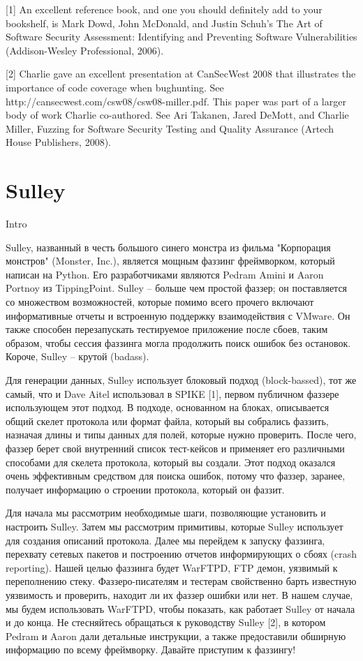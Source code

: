 \documentclass[12pt, a4paper, oneside]{book}
\begin{document}
[1] An excellent reference book, and one you should definitely add to your bookshelf, is Mark Dowd, John McDonald, and Justin Schuh’s The Art of Software Security Assessment: Identifying and Preventing Software Vulnerabilities (Addison-Wesley Professional, 2006).

[2] Charlie gave an excellent presentation at CanSecWest 2008 that illustrates the importance of code coverage when bughunting. See http://cansecwest.com/csw08/csw08-miller.pdf. This paper was part of a larger body of work Charlie co-authored. See Ari Takanen, Jared DeMott, and Charlie Miller, Fuzzing for Software Security Testing and Quality Assurance (Artech House Publishers, 2008).

\chapter{Sulley}
Intro

Sulley, названный в честь большого синего монстра из фильма "Корпорация монстров" (Monster, Inc.), является мощным фаззинг фреймворком, который написан на Python. Его разработчиками являются Pedram Amini и Aaron Portnoy из TippingPoint. Sulley – больше чем простой фаззер; он поставляется со множеством возможностей, которые помимо всего прочего включают информативные отчеты и встроенную поддержку взаимодействия с VMware. Он также способен перезапускать тестируемое приложение после сбоев, таким образом, чтобы сессия фаззинга могла продолжить поиск ошибок без остановок. Короче, Sulley – крутой (badass).

Для генерации данных, Sulley использует блоковый подход (block-bassed), тот же самый, что и Dave Aitel использовал в SPIKE [1], первом публичном фаззере использующем этот подход. В подходе, основанном на блоках, описывается общий скелет протокола или формат файла, который вы собрались фаззить, назначая длины и типы данных для полей, которые нужно проверить. После чего, фаззер берет свой внутренний список тест-кейсов и применяет его различными способами для скелета протокола, который вы создали. Этот подход оказался очень эффективным средством для поиска ошибок, потому что фаззер, заранее, получает информацию о строении протокола, который он фаззит.

Для начала мы рассмотрим необходимые шаги, позволяющие установить и настроить Sulley. Затем мы рассмотрим примитивы, которые Sulley использует для создания описаний протокола. Далее мы перейдем к запуску фаззинга, перехвату сетевых пакетов и построению отчетов информирующих о сбоях (crash reporting). Нашей целью фаззинга будет WarFTPD, FTP демон, уязвимый к переполнению стеку. Фаззеро-писателям и тестерам свойственно барть известную уязвимость и проверить, находит ли их фаззер ошибки или нет. В нашем случае, мы будем использовать WarFTPD, чтобы показать, как работает Sulley от начала и до конца. Не стесняйтесь обращаться к руководству Sulley [2], в котором Pedram и Aaron дали детальные инструкции, а также предоставили обширную информацию по всему фреймворку. Давайте приступим к фаззингу! 
\end{document}

